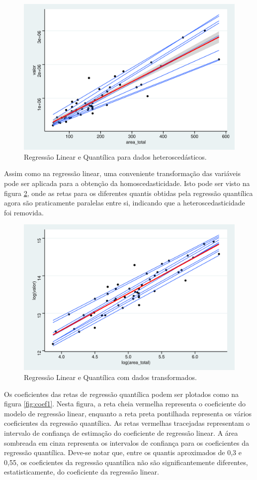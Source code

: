 \documentclass[a4paper, 12pt]{article}
\begin{document}
\begin{figure}[H]

{\centering \includegraphics[width=0.7\linewidth]{images/qr1-1} 

}

\caption{Regressão Linear e Quantílica para dados heteroscedásticos.}\label{fig:qr1}
\end{figure}

Assim como na regressão linear, uma conveniente transformação das
variáveis pode ser aplicada para a obtenção da homoscedasticidade. Isto
pode ser visto na figura \ref{fig:qr2}, onde as retas para os diferentes
quantis obtidas pela regressão quantílica agora são praticamente
paralelas entre si, indicando que a heteroscedasticidade foi removida.

\begin{figure}[H]

{\centering \includegraphics[width=0.7\linewidth]{images/qr2-1} 

}

\caption{Regressão Linear e Quantílica com dados transformados.}\label{fig:qr2}
\end{figure}

Os coeficientes das retas de regressão quantílica podem ser plotados
como na figura \ref{fig:coef1}. Nesta figura, a reta cheia vermelha
representa o coeficiente do modelo de regressão linear, enquanto a reta
preta pontilhada representa os vários coeficientes da regressão
quantílica. As retas vermelhas tracejadas representam o intervalo de
confiança de estimação do coeficiente de regressão linear. A área
sombreada em cinza representa os intervalos de confiança para os
coeficientes da regressão quantílica. Deve-se notar que, entre os
quantis aproximados de 0,3 e 0,55, os coeficientes da regressão
quantílica não são significantemente diferentes, estatisticamente, do
coeficiente da regressão linear.
\end{document}
